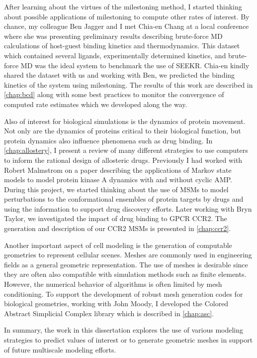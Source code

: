 \par After learning about the virtues of the milestoning method, I started thinking about possible applications of milestoning to compute other rates of interest.
By chance, my colleague Ben Jagger and I met Chia-en Chang at a local conference where she was presenting preliminary results describing brute-force MD calculations of host-guest binding kinetics and thermodynamics\cite{Tang2017}.
This dataset which contained several ligands, experimentally determined kinetics, and brute-force MD was the ideal system to benchmark the use of SEEKR\cite{Votapka2017c}.
Chia-en kindly shared the dataset with us and working with Ben, we predicted the binding kinetics of the system using milestoning.
The results of this work are described in \cref{chap:bcd} along with some best practices to monitor the convergence of computed rate estimates which we developed along the way.

\par Also of interest for biological simulations is the dynamics of protein movement.
Not only are the dynamics of proteins critical to their biological function, but protein dynamics also influence phenomena such as drug binding.
In \cref{chap:allostery}, I present a review of many different strategies to use computers to inform the rational design of allosteric drugs.
Previously I had worked with Robert Malmstrom on a paper describing the applications of Markov state models to model protein kinase A dynamics with and without cyclic AMP\cite{Malmstrom2015a}.
During this project, we started thinking about the use of MSMs to model perturbations to the conformational ensembles of protein targets by drugs and using the information to support drug discovery efforts.
Later working with Bryn Taylor, we investigated the impact of drug binding to GPCR CCR2.
The generation and description of our CCR2 MSMs is presented in \cref{chap:ccr2}.

\par Another important aspect of cell modeling is the generation of computable geometries to represent cellular scenes.
Meshes are commonly used in engineering fields as a general geometric representation.
The use of meshes is desirable since they are often also compatible with simulation methods such as finite elements.
However, the numerical behavior of algorithms is often limited by mesh conditioning.
To support the development of robust mesh generation codes for biological geometries, working with John Moody, I developed the Colored Abstract Simplicial Complex library which is described in \cref{chap:asc}.

\par In summary, the work in this dissertation explores the use of various modeling strategies to predict values of interest or to generate geometric meshes in support of future multiscale modeling efforts.

